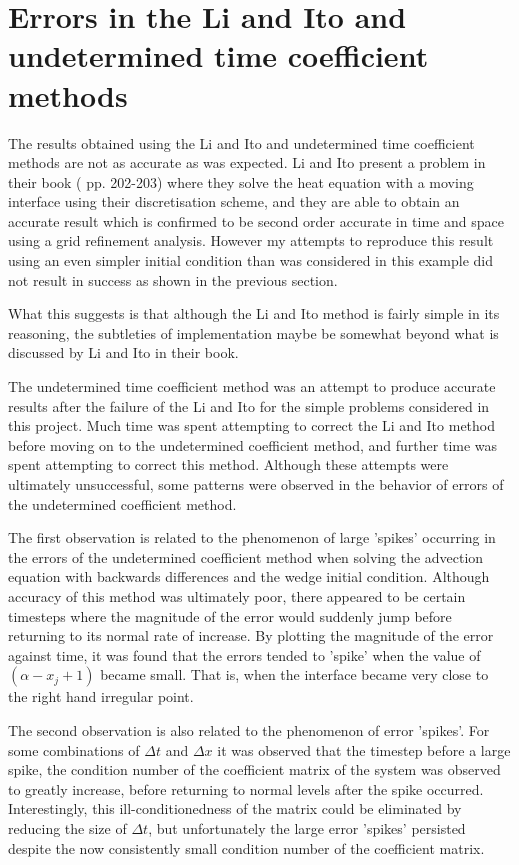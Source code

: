\section{Errors in the Li and Ito and undetermined time coefficient methods}

The results obtained using the Li and Ito and undetermined time coefficient methods are not as accurate as was expected.
Li and Ito present a problem in their book (\cite{liito06} pp. 202-203) where they solve the heat equation with a moving interface using their discretisation scheme, and they are able to obtain an accurate result which is confirmed to be second order accurate in time and space using a grid refinement analysis.
However my attempts to reproduce this result using an even simpler initial condition than was considered in this example did not result in success as shown in the previous section.

What this suggests is that although the Li and Ito method is fairly simple in its reasoning, the subtleties of implementation maybe be somewhat beyond what is discussed by Li and Ito in their book.

The undetermined time coefficient method was an attempt to produce accurate results after the failure of the Li and Ito for the simple problems considered in this project.
Much time was spent attempting to correct the Li and Ito method before moving on to the undetermined coefficient method, and further time was spent attempting to correct this method.
Although these attempts were ultimately unsuccessful, some patterns were observed in the behavior of errors of the undetermined coefficient method.

The first observation is related to the phenomenon of large 'spikes' occurring in the errors of the undetermined coefficient method when solving the advection equation with backwards differences and the wedge initial condition.
Although accuracy of this method was ultimately poor, there appeared to be certain timesteps where the magnitude of the error would suddenly jump before returning to its normal rate of increase.
By plotting the magnitude of the error against time, it was found that the errors tended to 'spike' when the value of $(\alpha - x_j+1)$ became small.
That is, when the interface became very close to the right hand irregular point.

The second observation is also related to the phenomenon of error 'spikes'.
For some combinations of $\Delta t$ and $\Delta x$ it was observed that the timestep before a large spike, the condition number of the coefficient matrix of the system was observed to greatly increase, before returning to normal levels after the spike occurred.
Interestingly, this ill-conditionedness of the matrix could be eliminated by reducing the size of $\Delta t$, but unfortunately the large error 'spikes' persisted despite the now consistently small condition number of the coefficient matrix.
